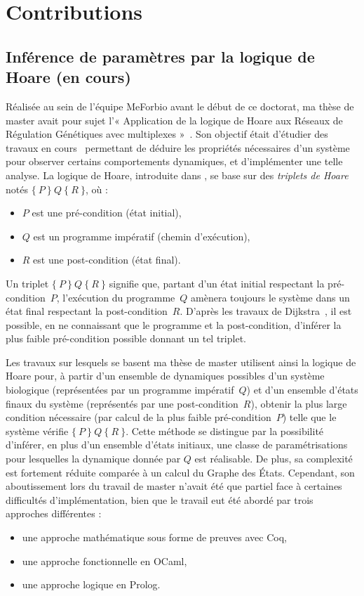 \chapter{Contributions}

\newcommand{\hoare}[3]{\{\ #1\ \}\ #2\ \{\ #3\ \}}

\section{Inférence de paramètres par la logique de Hoare \normalsize(en cours)}
\label{sec:hoare}

Réalisée au sein de l'équipe MeForbio avant le début de ce doctorat, ma thèse de master avait pour sujet l'« Application de la logique de Hoare aux Réseaux de Régulation Génétiques avec multiplexes »~\cite{Folschette2011}.
Son objectif était d'étudier des travaux en cours~\cite{khalis-bernot-comet-richard-roux-siebert-UnPublished} permettant de déduire les propriétés nécessaires d'un système pour observer certains comportements dynamiques, et d'implémenter une telle analyse.
La logique de Hoare, introduite dans \cite{hoare-69}, se base sur des \emph{triplets de Hoare} notés $\hoare{P}{Q}{R}$, où :
\begin{itemize}
  \item $P$ est une pré-condition (état initial),
  \item $Q$ est un programme impératif (chemin d'exécution),
  \item $R$ est une post-condition (état final).
\end{itemize}
Un triplet $\hoare{P}{Q}{R}$ signifie que, partant d'un état initial respectant la pré-condition~$P$, l'exécution du programme~$Q$ amènera toujours le système dans un état final respectant la post-condition~$R$.
D'après les travaux de Dijkstra~\cite{dijkstra-75}, il est possible, en ne connaissant que le programme et la post-condition,
d'inférer la plus faible pré-condition possible donnant un tel triplet.

Les travaux sur lesquels se basent ma thèse de master utilisent ainsi la logique de Hoare pour,
à partir d'un ensemble de dynamiques possibles d'un système biologique (représentées par un programme impératif~$Q$)
et d'un ensemble d'états finaux du système (représentés par une post-condition~$R$),
obtenir la plus large condition nécessaire (par calcul de la plus faible pré-condition~$P$)
telle que le système vérifie $\hoare{P}{Q}{R}$.
Cette méthode se distingue par la possibilité d'inférer, en plus d'un ensemble d'états initiaux, une classe de paramétrisations pour lesquelles la dynamique donnée par $Q$ est réalisable.
De plus, sa complexité est fortement réduite comparée à un calcul du Graphe des États.
Cependant, son aboutissement lors du travail de master n'avait été que partiel face à certaines difficultés d'implémentation, bien que le travail eut été abordé par trois approches différentes :
\begin{itemize}
  \item une approche mathématique sous forme de preuves avec Coq,
  \item une approche fonctionnelle en OCaml,
  \item une approche logique en Prolog.
\end{itemize}

